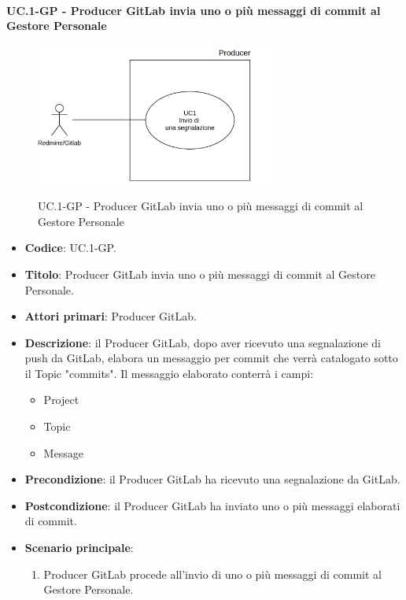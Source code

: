 	\paragraph{UC\theuccount.1-GP - Producer GitLab invia uno o più messaggi di commit al Gestore Personale}
	\begin{figure}[H]
		\centering
		\includegraphics[width=0.7\textwidth]{img/UC1.png}\\
		\caption{UC\theuccount.1-GP - Producer GitLab invia uno o più messaggi di commit al Gestore Personale}
	\end{figure}
	\begin{itemize}
		\item \textbf{Codice}: UC\theuccount.1-GP.
		\item \textbf{Titolo}: Producer GitLab invia uno o più messaggi di commit al Gestore Personale.
		\item \textbf{Attori primari}: Producer GitLab.
		\item \textbf{Descrizione}: il Producer GitLab, dopo aver ricevuto una segnalazione di push da GitLab, elabora un messaggio per commit che verrà catalogato sotto il Topic "commits".
		Il messaggio elaborato conterrà i campi:
		\begin{itemize}
			\item Project
			\item Topic
			\item Message
		\end{itemize}
		\item \textbf{Precondizione}: il Producer GitLab ha ricevuto una segnalazione da GitLab.
		\item \textbf{Postcondizione}: il Producer GitLab ha inviato uno o più messaggi elaborati di commit.
		\item \textbf{Scenario principale}: 
		\begin{enumerate}
			\item Producer GitLab procede all'invio di uno o più messaggi
		 di commit al Gestore Personale.
		\end{enumerate}
		
	\end{itemize}

